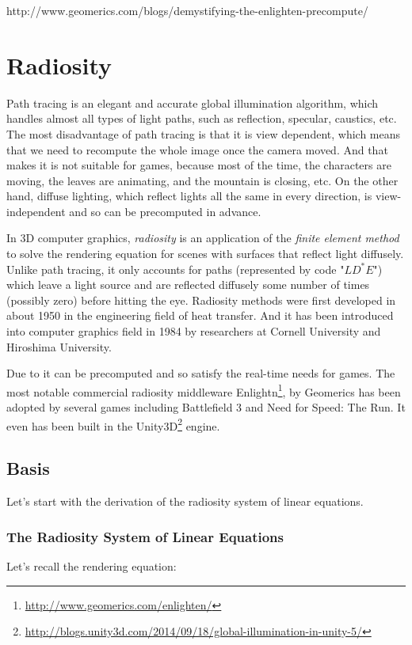http://www.geomerics.com/blogs/demystifying-the-enlighten-precompute/


\chapter{Radiosity}\label{chp:radiosity}
Path tracing is an elegant and accurate global illumination algorithm, which handles almost all types of light paths, such as reflection, specular, caustics, etc. The most disadvantage of path tracing is that it is view dependent, which means that we need to recompute the whole image once the camera moved. And that makes it is not suitable for games, because most of the time, the characters are moving, the leaves are animating, and the mountain is closing, etc. On the other hand, diffuse lighting, which reflect lights all the same in every direction, is view-independent and so can be precomputed in advance. 

In 3D computer graphics, \textit{radiosity} is an application of the \textit{finite element method} to solve the rendering equation for scenes with surfaces that reflect light diffusely. Unlike path tracing, it only accounts for paths (represented by code "$LD^{*}E$") which leave a light source and are reflected diffusely some number of times (possibly zero) before hitting the eye. Radiosity methods were first developed in about 1950 in the engineering field of heat transfer. And it has been introduced into computer graphics field in 1984\cite[-14mm]{a:ModelingtheInteractionofLightBetweenDiffuseSurfaces} by researchers at Cornell University and Hiroshima University.

Due to it can be precomputed and so satisfy the real-time needs for games. The most notable commercial radiosity middleware Enlightn\footnote{\url{http://www.geomerics.com/enlighten/}}, by Geomerics has been adopted by several games including Battlefield 3 and Need for Speed: The Run. It even has been built in the Unity3D\footnote{\url{http://blogs.unity3d.com/2014/09/18/global-illumination-in-unity-5/}} engine.




\section{Basis}
Let's start with the derivation of the radiosity system of linear equations.


\subsection{The Radiosity System of Linear Equations}
Let's recall the rendering equation:

